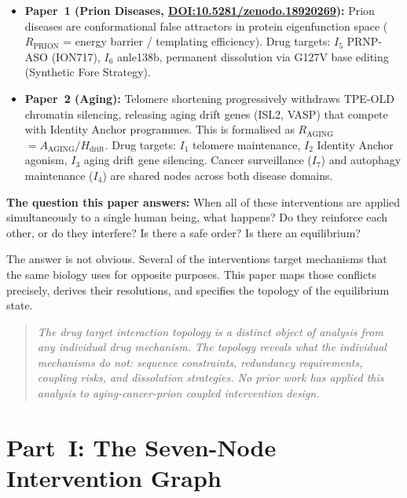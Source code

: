 \documentclass[12pt,a4paper]{article}
\newcommand{\raging}{$R_{\mathrm{AGING}}$}
\newcommand{\rprion}{$R_{\mathrm{PRION}}$}
\newcommand{\tpeold}{TPE-OLD}
\newcommand{\Inet}[1]{$I_{#1}$}
\begin{document}
\begin{itemize}[leftmargin=2em]
  \item \textbf{Paper~1 (Prion Diseases,
    \href{https://doi.org/10.5281/zenodo.18920269}{DOI:10.5281/zenodo.18920269}):}
    Prion diseases are conformational false attractors in protein eigenfunction
    space (\rprion{} = energy barrier / templating efficiency). Drug targets:
    \Inet{5} PRNP-ASO (ION717), \Inet{6} anle138b, permanent dissolution via
    G127V base editing (Synthetic Fore Strategy).

  \item \textbf{Paper~2 (Aging):}
    Telomere shortening progressively withdraws \tpeold{} chromatin silencing,
    releasing aging drift genes (ISL2, VASP) that compete with Identity Anchor
    programmes. This is formalised as \raging{} $= A_{\mathrm{AGING}} /
    H_{\mathrm{drift}}$. Drug targets: \Inet{1} telomere maintenance,
    \Inet{2} Identity Anchor agonism, \Inet{3} aging drift gene silencing.
    Cancer surveillance (\Inet{7}) and autophagy maintenance (\Inet{4}) are
    shared nodes across both disease domains.
\end{itemize}

\textbf{The question this paper answers:} When all of these interventions are
applied simultaneously to a single human being, what happens? Do they reinforce
each other, or do they interfere? Is there a safe order? Is there an equilibrium?

The answer is not obvious. Several of the interventions target mechanisms that
the same biology uses for opposite purposes. This paper maps those conflicts
precisely, derives their resolutions, and specifies the topology of the
equilibrium state.

\begin{quote}
\textit{The drug target interaction topology is a distinct object of analysis
from any individual drug mechanism. The topology reveals what the individual
mechanisms do not: sequence constraints, redundancy requirements, coupling
risks, and dissolution strategies. No prior work has applied this analysis to
aging-cancer-prion coupled intervention design.}
\end{quote}

\section{Part~I: The Seven-Node Intervention Graph}
\end{document}
